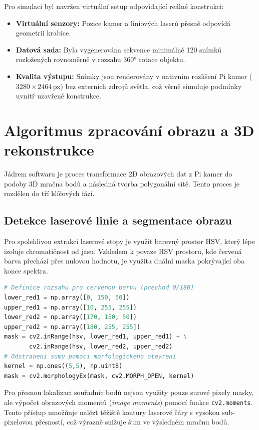 \documentclass[12pt,a4paper]{report}
\begin{document}
Pro simulaci byl navržen virtuální setup odpovídající reálné konstrukci:
\begin{itemize}
    \item \textbf{Virtuální senzory:} Pozice kamer a liniových laserů přesně odpovídá geometrii krabice.
    \item \textbf{Datová sada:} Byla vygenerována sekvence minimálně 120 snímků rozložených rovnoměrně v rozsahu 360° rotace objektu.
    \item \textbf{Kvalita výstupu:} Snímky jsou renderovány v nativním rozlišení Pi kamer ($3280 \times 2464$\,px) bez externích zdrojů světla, což věrně simuluje podmínky uvnitř uzavřené konstrukce.
\end{itemize}
\clearpage
\section{Algoritmus zpracování obrazu a 3D rekonstrukce}

Jádrem softwaru je proces transformace 2D obrazových dat z Pi kamer do podoby 3D mračna bodů a následná tvorba polygonální sítě. Tento proces je rozdělen do tří klíčových fází.
\vspace{-0.1cm}
\subsection{Detekce laserové linie a segmentace obrazu}
Pro spolehlivou extrakci laserové stopy je využit barevný prostor HSV, který lépe izoluje chromatičnost od jasu. Vzhledem k povaze HSV prostoru, kde červená barva přechází přes nulovou hodnotu, je využita duální maska pokrývající oba konce spektra.

\begin{lstlisting}[language=Python, basicstyle=\footnotesize\ttfamily, caption=Implementace duální HSV masky a morfologické filtrace]
# Definice rozsahu pro cervenou barvu (prechod 0/180)
lower_red1 = np.array([0, 150, 50])
upper_red1 = np.array([10, 255, 255])
lower_red2 = np.array([170, 150, 50])
upper_red2 = np.array([180, 255, 255])
mask = cv2.inRange(hsv, lower_red1, upper_red1) + \
       cv2.inRange(hsv, lower_red2, upper_red2)
# Odstraneni sumu pomoci morfologickeho otevreni
kernel = np.ones((5,5), np.uint8)
mask = cv2.morphologyEx(mask, cv2.MORPH_OPEN, kernel)
\end{lstlisting}

Pro přesnou lokalizaci souřadnic bodů nejsou využity pouze surové pixely masky, ale výpočet obrazových momentů (\textit{image moments}) pomocí funkce \texttt{cv2.moments}. Tento přístup umožňuje nalézt těžiště kontury laserové čáry s vysokou sub-pixelovou přesností, což výrazně snižuje šum ve výsledném mračnu bodů.
\end{document}
